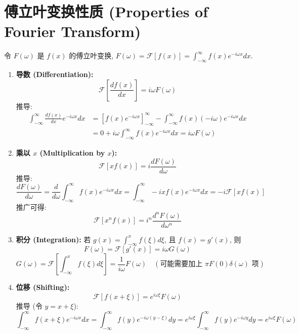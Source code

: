 \documentclass{article}
\begin{document}
	\section{傅立叶变换性质 (Properties of Fourier Transform)}
	令 $F(\omega)$ 是 $f(x)$ 的傅立叶变换, $F(\omega) = \mathcal{F}[f(x)] = \int_{-\infty}^{\infty} f(x) e^{-i\omega x} dx$.
	
	\begin{enumerate}
		\item \textbf{导数 (Differentiation):}
		$$ \mathcal{F}\left[\frac{df(x)}{dx}\right] = i\omega F(\omega) $$
		推导:
		\begin{align*}
			\int_{-\infty}^{\infty} \frac{df(x)}{dx} e^{-i\omega x} dx &= \left[ f(x) e^{-i\omega x} \right]_{-\infty}^{\infty} - \int_{-\infty}^{\infty} f(x) (-i\omega) e^{-i\omega x} dx \\
			&= 0 + i\omega \int_{-\infty}^{\infty} f(x) e^{-i\omega x} dx = i\omega F(\omega)
		\end{align*}
		
		\item \textbf{乘以 $x$ (Multiplication by $x$):}
		$$ \mathcal{F}[x f(x)] = i \frac{dF(\omega)}{d\omega} $$
		推导:
		$$ \frac{dF(\omega)}{d\omega} = \frac{d}{d\omega} \int_{-\infty}^{\infty} f(x) e^{-i\omega x} dx = \int_{-\infty}^{\infty} -ix f(x) e^{-i\omega x} dx = -i \mathcal{F}[x f(x)] $$
		推广可得:
		$$ \mathcal{F}[x^n f(x)] = i^n \frac{d^n F(\omega)}{d\omega^n} $$
		
		\item \textbf{积分 (Integration):}
		若 $g(x) = \int_{-\infty}^x f(\xi) d\xi$, 且 $f(x)=g'(x)$, 则
		$$ F(\omega) = \mathcal{F}[g'(x)] = i\omega G(\omega) $$
		$$ G(\omega) = \mathcal{F}\left[\int_{-\infty}^x f(\xi)d\xi\right] = \frac{1}{i\omega}F(\omega) \quad (\text{可能需要加上 } \pi F(0)\delta(\omega) \text{ 项})$$
		
		\item \textbf{位移 (Shifting):}
		$$ \mathcal{F}[f(x+\xi)] = e^{i\omega\xi} F(\omega) $$
		推导 (令 $y=x+\xi$):
		$$ \int_{-\infty}^{\infty} f(x+\xi) e^{-i\omega x} dx = \int_{-\infty}^{\infty} f(y) e^{-i\omega(y-\xi)} dy = e^{i\omega\xi} \int_{-\infty}^{\infty} f(y) e^{-i\omega y} dy = e^{i\omega\xi} F(\omega) $$
		

\end{enumerate}
\end{document}
